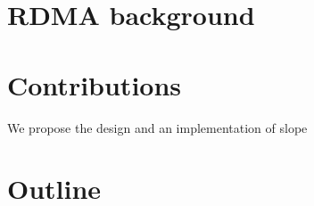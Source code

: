 \section{RDMA background}






\section{Contributions}
We propose the design and an implementation of slope





\section{Outline}

